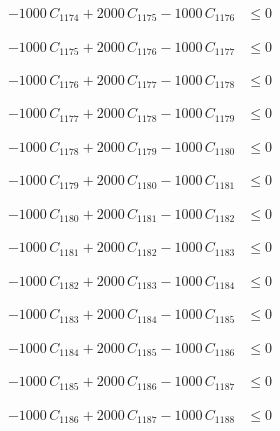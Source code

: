 \documentclass[a4paper,11pt]{article}
\begin{document}
\begin{align}
-1000\,C_{1174} + 2000\,C_{1175} - 1000\,C_{1176} &\leq 0 \nonumber
\end{align}

\begin{align}
-1000\,C_{1175} + 2000\,C_{1176} - 1000\,C_{1177} &\leq 0 \nonumber
\end{align}

\begin{align}
-1000\,C_{1176} + 2000\,C_{1177} - 1000\,C_{1178} &\leq 0 \nonumber
\end{align}

\begin{align}
-1000\,C_{1177} + 2000\,C_{1178} - 1000\,C_{1179} &\leq 0 \nonumber
\end{align}

\begin{align}
-1000\,C_{1178} + 2000\,C_{1179} - 1000\,C_{1180} &\leq 0 \nonumber
\end{align}

\begin{align}
-1000\,C_{1179} + 2000\,C_{1180} - 1000\,C_{1181} &\leq 0 \nonumber
\end{align}

\begin{align}
-1000\,C_{1180} + 2000\,C_{1181} - 1000\,C_{1182} &\leq 0 \nonumber
\end{align}

\begin{align}
-1000\,C_{1181} + 2000\,C_{1182} - 1000\,C_{1183} &\leq 0 \nonumber
\end{align}

\begin{align}
-1000\,C_{1182} + 2000\,C_{1183} - 1000\,C_{1184} &\leq 0 \nonumber
\end{align}

\begin{align}
-1000\,C_{1183} + 2000\,C_{1184} - 1000\,C_{1185} &\leq 0 \nonumber
\end{align}

\begin{align}
-1000\,C_{1184} + 2000\,C_{1185} - 1000\,C_{1186} &\leq 0 \nonumber
\end{align}

\begin{align}
-1000\,C_{1185} + 2000\,C_{1186} - 1000\,C_{1187} &\leq 0 \nonumber
\end{align}

\begin{align}
-1000\,C_{1186} + 2000\,C_{1187} - 1000\,C_{1188} &\leq 0 \nonumber
\end{align}
\end{document}
